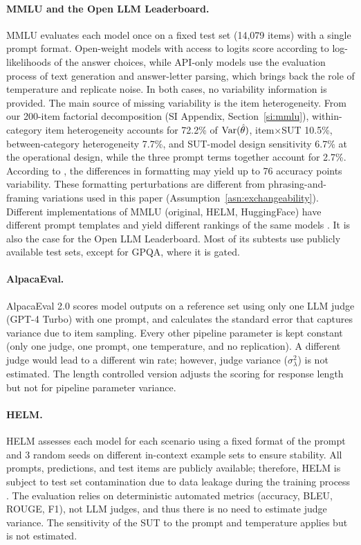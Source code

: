 \paragraph{MMLU and the Open LLM Leaderboard.} MMLU \citep{hendrycks2021mmlu} evaluates each model once on a fixed test set (14,079 items) with a single prompt format. Open-weight models with access to logits score according to log-likelihoods of the answer choices, while API-only models use the evaluation process of text generation and answer-letter parsing, which brings back the role of temperature and replicate noise. In both cases, no variability information is provided. The main source of missing variability is the item heterogeneity. From our 200-item factorial decomposition (SI Appendix, Section~\ref{si:mmlu}), within-category item heterogeneity accounts for 72.2\% of $\operatorname{Var}(\hat\theta)$, item$\times$SUT 10.5\%, between-category heterogeneity 7.7\%, and SUT-model design sensitivity 6.7\% at the operational design, while the three prompt terms together account for 2.7\%. According to \citet{sclar2024sensitivity}, the differences in formatting may yield up to 76 accuracy points variability. These formatting perturbations are different from phrasing-and-framing variations used in this paper (Assumption~\ref{asn:exchangeability}). Different implementations of MMLU (original, HELM, HuggingFace) have different prompt templates and yield different rankings of the same models \citep{alzahrani2024benchmarks}. It is also the case for the Open LLM Leaderboard. Most of its subtests use publicly available test sets, except for GPQA, where it is gated.

\paragraph{AlpacaEval.} AlpacaEval 2.0 \citep{dubois2024alpacaeval} scores model outputs on a reference set using only one LLM judge (GPT-4 Turbo) with one prompt, and calculates the standard error that captures variance due to item sampling. Every other pipeline parameter is kept constant (only one judge, one prompt, one temperature, and no replication). A different judge would lead to a different win rate; however, judge variance ($\sigma^2_\lambda$) is not estimated. The length controlled version adjusts the scoring for response length but not for pipeline parameter variance.

\paragraph{HELM.} HELM \citep{liang2023helm} assesses each model for each scenario using a fixed format of the prompt and 3 random seeds on different in-context example sets to ensure stability. All prompts, predictions, and test items are publicly available; therefore, HELM is subject to test set contamination due to data leakage during the training process \citep{xu2024benbench}. The evaluation relies on deterministic automated metrics (accuracy, BLEU, ROUGE, F1), not LLM judges, and thus there is no need to estimate judge variance. The sensitivity of the SUT to the prompt and temperature applies but is not estimated.

